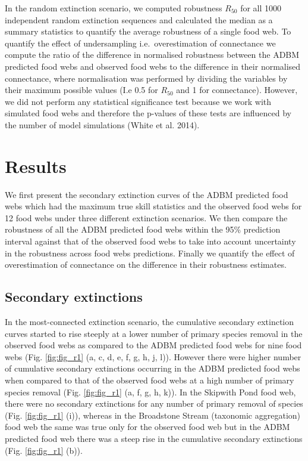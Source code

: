 \documentclass{article}
\begin{document}
In the random extinction scenario, we computed robustness \(R_{50}\) for
all 1000 independent random extinction sequences and calculated the
median as a summary statistics to quantify the average robustness of a
single food web. To quantify the effect of undersampling
i.e.~overestimation of connectance we compute the ratio of the
difference in normalised robustness between the ADBM predicted food webs
and observed food webs to the difference in their normalised
connectance, where normalisation was performed by dividing the variables
by their maximum possible values (I.e 0.5 for \(R_{50}\) and 1 for
connectance). However, we did not perform any statistical significance
test because we work with simulated food webs and therefore the p-values
of these tests are influenced by the number of model simulations (White
et al. 2014).

\hypertarget{results}{%
\section{Results}\label{results}}

We first present the secondary extinction curves of the ADBM predicted
food webs which had the maximum true skill statistics and the observed
food webs for 12 food webs under three different extinction scenarios.
We then compare the robustness of all the ADBM predicted food webs
within the 95\% prediction interval against that of the observed food
webs to take into account uncertainty in the robustness across food webs
predictions. Finally we quantify the effect of overestimation of
connectance on the difference in their robustness estimates.

\hypertarget{secondary-extinctions}{%
\subsection{Secondary extinctions}\label{secondary-extinctions}}

In the most-connected extinction scenario, the cumulative secondary
extinction curves started to rise steeply at a lower number of primary
species removal in the observed food webs as compared to the ADBM
predicted food webs for nine food webs (Fig. \ref{fig:fig_r1} (a, c, d,
e, f, g, h, j, l)). However there were higher number of cumulative
secondary extinctions occurring in the ADBM predicted food webs when
compared to that of the observed food webs at a high number of primary
species removal (Fig. \ref{fig:fig_r1} (a, f, g, h, k)). In the Skipwith
Pond food web, there were no secondary extinctions for any number of
primary removal of species (Fig. \ref{fig:fig_r1} (i)), whereas in the
Broadstone Stream (taxonomic aggregation) food web the same was true
only for the observed food web but in the ADBM predicted food web there
was a steep rise in the cumulative secondary extinctions (Fig.
\ref{fig:fig_r1} (b)).
\end{document}
